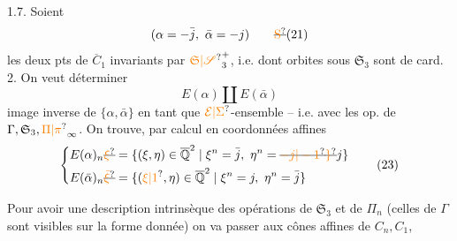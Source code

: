 1.7. Soient
\[
(\alpha=-\bar j,\ \bar\alpha=-j)\tag*{\deleted{\unsure{S}}(21)}
\]
les deux pts de $\overline C_1$ invariants par $\unsure{\mathfrak S|\mathscr S}_3^+$, i.e. dont
 orbites sous $\mathfrak S_3$ sont de card. 2. On veut
déterminer
\[
E(\alpha)\amalg E(\bar\alpha)\tag*{(22)}
\]
image inverse de $\{\alpha,\bar\alpha\}$ en tant que
$\unsure{\mathcal E|\Sigma}$-ensemble -- i.e. avec les op. de $\Gamma,\mathfrak S_3,\unsure{\Pi|\pi}_\infty$.
On trouve, par calcul en coordonnées affines
\[
\left\{\begin{aligned}
E(\alpha)_n\deleted{\unsure{\xi}}&=
\{(\xi,\eta)\in\overline{\mathbb Q}^2\mid \xi^n=\bar j,\ \eta^n=\deleted{\unsure{-j|-1}}\deleted{\unsure{\rbrace}}j\}\\
E(\bar\alpha)_n\deleted{\unsure{\bar\xi}}&=
\{(\unsure{\xi|1},\eta)\in\overline{\mathbb Q}^2\mid \xi^n=j,\ \eta^n=\bar j\}
\end{aligned}\right.\tag*{(23)}
\]

Pour avoir une description intrinsèque des
opérations de $\mathfrak S_3$ et de $\Pi_n$ (celles de $\Gamma$ sont
visibles sur la forme donnée) on va 
 passer aux cônes affines  de
$C_n,C_1$, 
